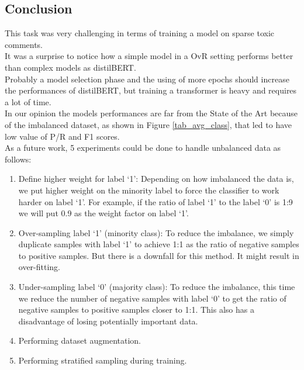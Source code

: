 \documentclass[10.5pt]{article}
\begin{document}
\begin{multicols*}{2}

\section{Conclusion}
This task was very challenging in terms of training a model on sparse toxic comments.\\
It was a surprise to notice how a simple model in a OvR setting performs better than complex models as distilBERT.\\
Probably a model selection phase and the using of more epochs should increase the performances of distilBERT, but training a transformer is heavy and requires a lot of time.\\
In our opinion the models performances are far from the State of the Art because of the imbalanced dataset, as shown in Figure \ref{tab_avg_class}, that led to have low value of P/R and F1 scores.\\

As a future work, 5 experiments could be done to handle unbalanced data as follows:
\begin{enumerate}
    \item Define higher weight for label ‘1’: Depending on how imbalanced the data is, we put higher weight on the minority label to force the classifier to work harder on label ‘1’. For example, if the ratio of label ‘1’ to the label ‘0’ is 1:9 we will put 0.9 as the weight factor on label ‘1’.
    \item Over-sampling label ‘1’ (minority class): To reduce the imbalance, we simply duplicate samples with label ‘1’ to achieve 1:1 as the ratio of negative samples to positive samples. But there is a downfall for this method. It might result in over-fitting.
    \item Under-sampling label ‘0’ (majority class): To reduce the imbalance, this time we reduce the number of negative samples with label ‘0’ to get the ratio of negative samples to positive samples closer to 1:1. This also has a disadvantage of losing potentially important data.
    \item Performing dataset augmentation.
    \item Performing stratified sampling during training.
\end{enumerate}





\end{multicols*}
\end{document}
